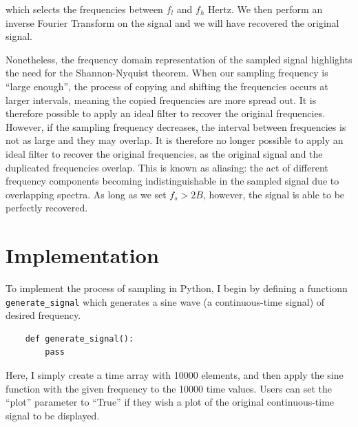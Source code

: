\documentclass{article}
\begin{document}
which selects the frequencies between $f_l$ and $f_h$ Hertz. %
We then perform an inverse Fourier Transform on the signal and we will have recovered the original signal. %

Nonetheless, the frequency domain representation of the sampled signal highlights the need for the Shannon-Nyquist theorem. %
When our sampling frequency is ``large enough'', the process of copying and shifting the frequencies occurs at larger intervals, meaning the copied frequencies are more spread out. It is therefore possible to apply an ideal filter to recover the original frequencies. %
However, if the sampling frequency decreases, the interval between frequencies is not as large and they may overlap. It is therefore no longer possible to apply an ideal filter to recover the original frequencies, as the original signal and the duplicated frequencies overlap.
This is known as aliasing: the act of different frequency components becoming indistinguishable in the sampled signal due to overlapping spectra. %
As long as we set $f_s > 2B$, however, the signal is able to be perfectly recovered. 



\section{Implementation}
To implement the process of sampling in Python, I begin by defining a functionn \verb|generate_signal| which generates a sine wave (a continuous-time signal) of desired frequency.
\begin{verbatim}
    def generate_signal():
        pass
\end{verbatim}
Here, I simply create a time array with 10000 elements, and then apply the sine function with the given frequency to the 10000 time values. 
Users can set the ``plot'' parameter to ``True'' if they wish a plot of the original continuous-time signal to be displayed.
\end{document}
